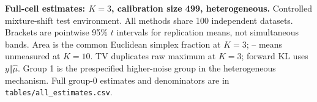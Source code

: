 \textbf{Full-cell estimates: $K=3$, calibration size 499, heterogeneous.} Controlled mixture-shift test environment. All methods share 100 independent datasets. Brackets are pointwise 95\% $t$ intervals for replication means, not simultaneous bands. Area is the common Euclidean simplex fraction at $K=3$; -- means unmeasured at $K=10$. TV duplicates raw maximum at $K=3$; forward KL uses $y\Vert\hat\mu$. Group 1 is the prespecified higher-noise group in the heterogeneous mechanism. Full group-0 estimates and denominators are in \texttt{tables/all\_estimates.csv}.
